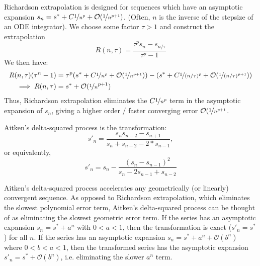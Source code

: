 \documentclass{puthesis}
\begin{document}
Richardson extrapolation is designed for sequences which have an asymptotic
expansion $s_n = s^* + C \nicefrac{1}{n^p} + \mathcal{O}(\nicefrac{1}{n^{p+1}})$. (Often, $n$ is the inverse of the
stepsize of an ODE integrator).
We choose some factor $\tau > 1$ and construct the extrapolation
\[
R(n, \tau) = \frac{\tau^p s_n - s_{n/\tau}}{\tau^p - 1}
\]
We then have:
\begin{align*}
R(n, \tau)(\tau^n - 1) &= \tau^p(s^* + C \nicefrac{1}{n^p} + \mathcal{O}(\nicefrac{1}{n^{p+1}})) - (s^* + C \nicefrac{1}{(n/\tau)^p} + \mathcal{O}(\nicefrac{1}{(n/\tau)^{p+1}}))\\
\implies R(n, \tau) &= s^* + \mathcal{O}(\nicefrac{1}{n}^{p+1})
\end{align*}
Thus, Richardson extrapolation eliminates the $C \nicefrac{1}{n^p}$ term in
the asymptotic expansion of $s_n$, giving a higher order / faster converging error
$\mathcal{O}(\nicefrac{1}{n^{p+1}}$.

Aitken's delta-squared process is the transformation:
\[
s'_n = \frac{s_n s_{n-2} - s_{n+1}}{s_n + s_{n-2} - 2*s_{n-1}},
\]
or equivalently,
\[
s'_n = s_n - \frac{(s_n - s_{n-1})^2}{s_n - 2 s_{n-1} + s_{n-2}}
\]

Aitken's delta-squared process accelerates any geometrically (or linearly)
convergent sequence.
As opposed to Richardson extrapolation, which eliminates the slowest polynomial error term, Aitken's delta-squared process can be thought of as eliminating the slowest geometric error term.
If the series has an asymptotic expansion $s_n = s^* + a^n$ with $0 < a < 1$, then the transformation is exact ($s'_n = s^*$) for all $n$. If the series has an asymptotic expansion $s_n = s^* + a^n + \mathcal{O}(b^n)$   where $0 < b < a < 1$, then the transformed series has the asymptotic
expansion $s'_n = s^* + \mathcal{O}(b^n)$, i.e. eliminating the slower
$a^n$ term.
\end{document}
